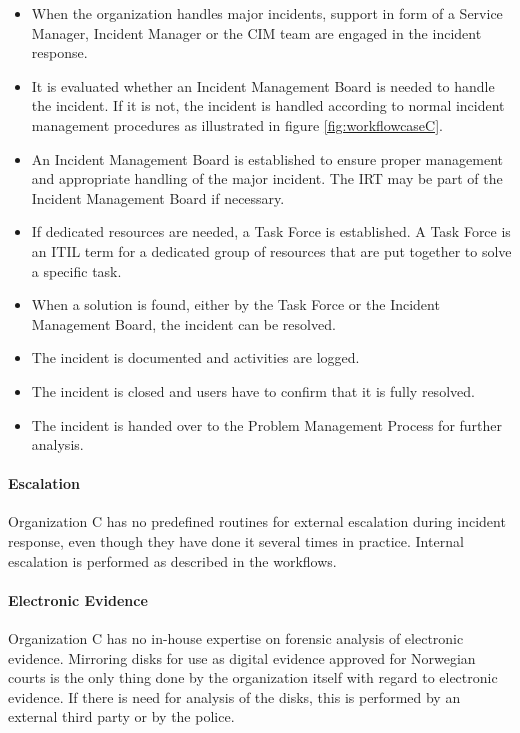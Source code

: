 \begin{itemize}\itemsep-0.1cm
\item When the organization handles major incidents, support in form of a Service Manager, Incident Manager or the \ac{CIM} team are engaged in the incident response.
\item It is evaluated whether an Incident Management Board is needed to handle the incident. If it is not, the incident is handled according to normal incident management procedures as illustrated in figure \ref{fig:workflowcaseC}.
\item An Incident Management Board is established to ensure proper management and appropriate handling of the major incident. The \ac{IRT} may be part of the Incident Management Board if necessary.
\item If dedicated resources are needed, a Task Force is established. A Task Force is an ITIL term for a dedicated group of resources that are put together to solve a specific task.
\item When a solution is found, either by the Task Force or the Incident Management Board, the incident can be resolved.
\item The incident is documented and activities are logged.
\item The incident is closed and users have to confirm that it is fully resolved.
\item The incident is handed over to the Problem Management Process for further analysis.  
\end{itemize}

\paragraph{Escalation}
Organization C has no predefined routines for external escalation during incident response, even though they have done it several times in practice. Internal escalation is performed as described in the workflows.

\paragraph{Electronic Evidence}
Organization C has no in-house expertise on forensic analysis of electronic evidence. Mirroring disks for use as digital evidence approved for Norwegian courts is the only thing done by the organization itself with regard to electronic evidence. If there is need for analysis of the disks, this is performed by an external third party or by the police.

